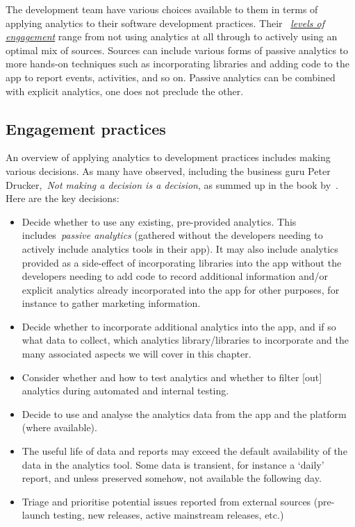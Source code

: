 The development team have various choices available to them in terms of applying analytics to their software development practices. Their ~\href{subsection-levels-of-engagement}{\emph{levels of engagement}} range from not using analytics at all through to actively using an optimal mix of sources. 
Sources can include various forms of passive analytics to more hands-on techniques such as incorporating libraries and adding code to the app to report events, activities, and so on. 
Passive analytics can be combined with explicit analytics, one does not preclude the other.

\subsection{Engagement practices}
An overview of applying analytics to development practices includes making various decisions. As many have observed, including the business guru Peter Drucker,~\emph{Not making a decision is a decision}, as summed up in the book by~\cite{gunther2013truth_about_better_decision_making}. %
Here are the key decisions:

\begin{itemize}
    \item Decide whether to use any existing, pre-provided analytics. This includes~\emph{passive analytics} (gathered without the developers needing to actively include analytics tools in their app). It may also include analytics provided as a side-effect of incorporating libraries into the app without the developers needing to add code to record additional information and/or explicit analytics already incorporated into the app for other purposes, for instance to gather marketing information. 
    \item Decide whether to incorporate additional analytics into the app, and if so what data to collect, which analytics library/libraries to incorporate and the many associated aspects we will cover in this chapter.
    \item Consider whether and how to test analytics and whether to filter [out] analytics during automated and internal testing.
    \item Decide to use and analyse the analytics data from the app and the platform (where available).
    \item The useful life of data and reports may exceed the default availability of the data in the analytics tool. Some data is transient, for instance a `daily' report, and unless preserved somehow, not available the following day.
    \item Triage and prioritise potential issues reported from external sources (pre-launch testing, new releases, active mainstream releases, etc.)
\end{itemize}

